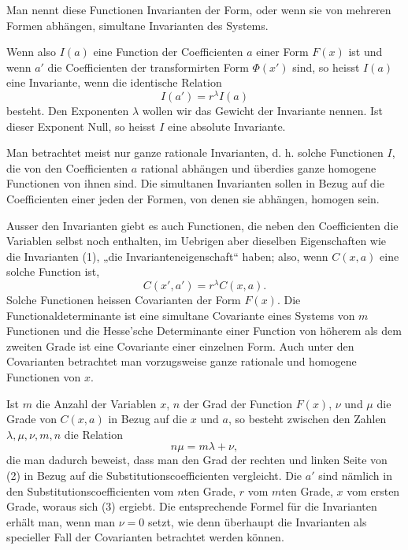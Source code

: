 \documentclass[11pt]{article}
\begin{document}
Man nennt diese Functionen Invarianten der Form, oder wenn sie von mehreren Formen abhängen, simultane Invarianten des Systems.

Wenn also $I(a)$ eine Function der Coefficienten $a$ einer Form $F(x)$ ist und wenn $a'$ die Coefficienten der transformirten Form $\Phi(x')$ sind, so heisst $I(a)$ eine Invariante, wenn die identische Relation
\begin{equation}
 I(a')=r^\lambda I(a)
\tag{1}
\end{equation}
besteht. Den Exponenten $\lambda$ wollen wir das Gewicht der Invariante nennen. Ist dieser Exponent Null, so heisst $I$ eine absolute Invariante.

Man betrachtet meist nur ganze rationale Invarianten, d. h. solche Functionen $I$, die von den Coefficienten $a$ rational abhängen und überdies ganze homogene Functionen von ihnen sind. Die simultanen Invarianten sollen in Bezug auf die Coefficienten einer jeden der Formen, von denen sie abhängen, homogen sein.

Ausser den Invarianten giebt es auch Functionen, die neben den Coefficienten die Variablen selbst noch enthalten, im Uebrigen aber dieselben Eigenschaften wie die Invarianten (1), „die Invarianteneigenschaft“ haben; also, wenn $C(x,a)$ eine solche Function ist,
\begin{equation}
 C(x',a')=r^\lambda C(x,a).
\tag{2}
\end{equation}
Solche Functionen heissen Covarianten der Form $F(x)$. Die Functionaldeterminante ist eine simultane Covariante eines Systems von $m$ Functionen und die Hesse'sche Determinante einer Function von höherem als dem zweiten Grade ist eine Covariante einer einzelnen Form. Auch unter den Covarianten betrachtet man vorzugsweise ganze rationale und homogene Functionen von $x$.

Ist $m$ die Anzahl der Variablen $x$, $n$ der Grad der Function $F(x)$, $\nu$ und $\mu$ die Grade von $C(x,a)$ in Bezug auf die $x$ und $a$, so besteht zwischen den Zahlen $\lambda,\mu,\nu,m,n$ die Relation
\begin{equation}
 n\mu=m\lambda+\nu,
\tag{3}
\end{equation}
die man dadurch beweist, dass man den Grad der rechten und linken Seite von (2) in Bezug auf die Substitutionscoefficienten vergleicht. Die $a'$ sind nämlich in den Substitutionscoefficienten vom $n$ten Grade, $r$ vom $m$ten Grade, $x$ vom ersten Grade, woraus sich (3) ergiebt. Die entsprechende Formel für die Invarianten erhält man, wenn man $\nu=0$ setzt, wie denn überhaupt die Invarianten als specieller Fall der Covarianten betrachtet werden können.
\end{document}
